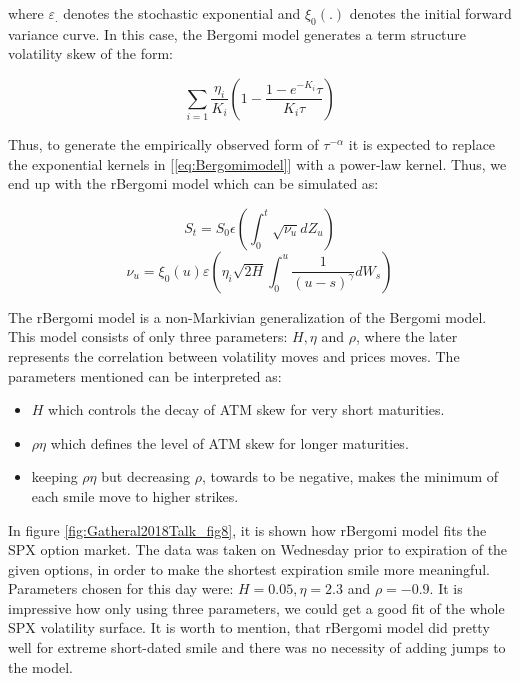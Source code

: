 \documentclass[12pt,oneside]{article}
\begin{document}
where $\varepsilon_{.}$ denotes the stochastic exponential and $\xi_{0}(.)$ denotes the initial forward variance curve. In this case, the Bergomi model generates a term structure volatility skew of the form:

$$\sum_{i=1}^{} \frac{\eta_{i}}{K_{i}} (1- \frac{1-e^{-K_{i}} \tau}{{K_{i}} \tau})$$

Thus, to generate the empirically observed form of $\tau^{-\alpha}$ it is expected to replace the exponential kernels in [\ref{eq:Bergomimodel}] with a power-law kernel. Thus, we end up with the rBergomi model which can be simulated as:

\begin{equation}
    S_{t} = S_{0} \epsilon (\int_{0}^{t} \sqrt{\nu_{u}} dZ_{u})
\end{equation}
\begin{equation}
    \nu_{u} = \xi_{0}(u) \varepsilon ( \eta_{i} \sqrt{2H} \int_{0}^{u} \frac{1}{(u-s)^{\gamma}} dW_{s})
\end{equation}

The rBergomi model is a non-Markivian generalization of the Bergomi model. This model consists of only three parameters: $H, \eta$ and $\rho$, where the later represents the correlation between volatility moves and prices moves. The parameters mentioned can be interpreted as:

\begin{itemize}
    \item $H$ which controls the decay of ATM skew for very short maturities.
    \item $\rho \eta$ which defines the level of ATM skew for longer maturities.
    \item keeping $\rho \eta$ but decreasing $\rho$, towards to be negative, makes the minimum of each smile move to higher strikes.
\end{itemize}

In figure \ref{fig:Gatheral2018Talk_fig8}, it is shown how rBergomi model fits the SPX option market. The data was taken on Wednesday prior to expiration of the given options, in order to make the shortest expiration smile more meaningful. Parameters chosen for this day were: $H = 0.05, \eta = 2.3$ and $\rho = -0.9$. It is impressive how only using three parameters, we could get a good fit of the whole SPX volatility surface. It is worth to mention, that rBergomi model did pretty well for extreme short-dated smile and there was no necessity of adding jumps to the model.
\end{document}
